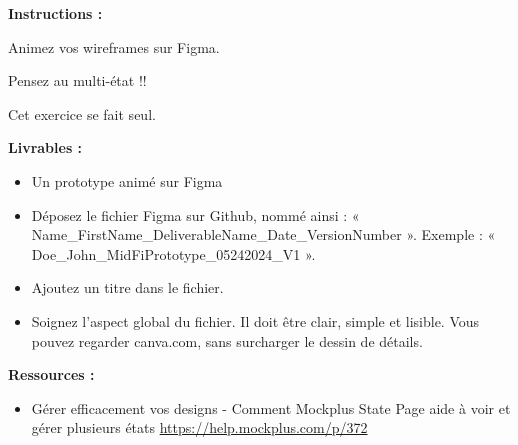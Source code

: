 \makeheaderfiles

\textbf{Instructions :}

Animez vos wireframes sur Figma.

Pensez au multi-état !!

Cet exercice se fait seul.

\textbf{Livrables :}

\begin{itemize}
\item Un prototype animé sur Figma
\item Déposez le fichier Figma sur Github, nommé ainsi : « Name\_FirstName\_DeliverableName\_Date\_VersionNumber ». Exemple : « Doe\_John\_MidFiPrototype\_05242024\_V1 ».
\item Ajoutez un titre dans le fichier.
\item Soignez l'aspect global du fichier. Il doit être clair, simple et lisible. Vous pouvez regarder canva.com, sans surcharger le dessin de détails.
\end{itemize}

\textbf{Ressources :}

\begin{itemize}
\item Gérer efficacement vos designs - Comment Mockplus State Page aide à voir et gérer plusieurs états \url{https://help.mockplus.com/p/372}
\end{itemize}

